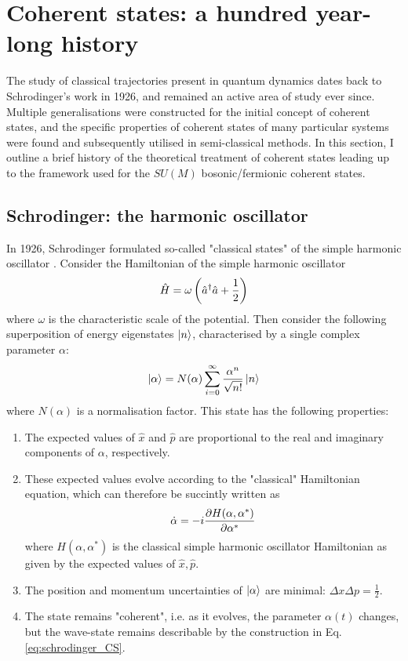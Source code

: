 \section{Coherent states: a hundred year-long history}
The study of classical trajectories present in quantum dynamics dates back to Schrodinger's work in 1926, and remained an active area of study ever since. Multiple generalisations were constructed for the initial concept of coherent states, and the specific properties of coherent states of many particular systems were found and subsequently utilised in semi-classical methods. In this section, I outline a brief history of the theoretical treatment of coherent states leading up to the framework used for the $SU(M)$ bosonic/fermionic coherent states.
	
\subsection{Schrodinger: the harmonic oscillator}
In 1926, Schrodinger formulated so-called "classical states" of the simple harmonic oscillator \cite{harmonic_classical_states}. Consider the Hamiltonian of the simple harmonic oscillator
\begin{equation}
\hat{H}=\omega \left(\hat{a}^\dagger\hat{a}+\frac{1}{2}\right)
\end{equation}
where $\omega$ is the characteristic scale of the potential. Then consider the following superposition of energy eigenstates $\ket{n}$, characterised by a single complex parameter $\alpha$:
\begin{equation} \label{eq:schrodinger_CS}
\ket{\alpha}=N(\alpha)\sum_{i=0}^\infty \frac{\alpha^n}{\sqrt{n!}}\ket{n}
\end{equation}
where $N(\alpha)$ is a normalisation factor. This state has the following properties:
\begin{enumerate}
	\item The expected values of $\hat{x}$ and $\hat{p}$ are proportional to the real and imaginary components of $\alpha$, respectively.
	\item These expected values evolve according to the "classical" Hamiltonian equation, which can therefore be succintly written as
	\begin{equation}
	\dot{\alpha}=-i\pdv{H(\alpha, \alpha^*)}{\alpha^*}
	\end{equation}
	where $H(\alpha, \alpha^*)$ is the classical simple harmonic oscillator Hamiltonian as given by the expected values of $\hat{x}, \hat{p}$.
	\item The position and momentum uncertainties of $\ket{\alpha}$ are minimal: $\Delta x\Delta p=\frac{1}{2}$.
	\item The state remains "coherent", i.e. as it evolves, the parameter $\alpha(t)$ changes, but the wave-state remains describable by the construction in Eq. \ref{eq:schrodinger_CS}.
\end{enumerate}
